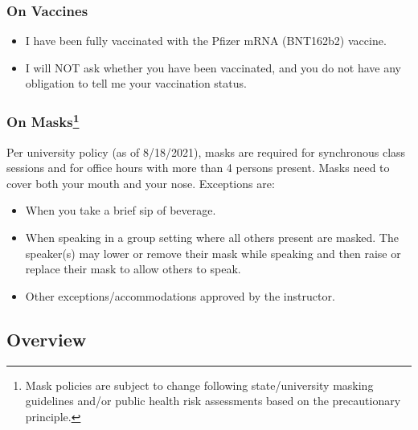 \documentclass[
]{article}
\providecommand{\tightlist}{%
  \setlength{\itemsep}{0pt}\setlength{\parskip}{0pt}}
\begin{document}
\hypertarget{on-vaccines}{%
\subsubsection{On Vaccines}\label{on-vaccines}}

\begin{itemize}
\tightlist
\item
  I have been fully vaccinated with the Pfizer mRNA (BNT162b2) vaccine.
\item
  I will NOT ask whether you have been vaccinated, and you do not have
  any obligation to tell me your vaccination status.
\end{itemize}

\hypertarget{on-masks2}{%
\subsubsection[On Masks]{\texorpdfstring{On
Masks\footnote{Mask policies are subject to change following
  state/university masking guidelines and/or public health risk
  assessments based on the precautionary principle.}}{On Masks}}\label{on-masks2}}

Per university policy (as of 8/18/2021), masks are required for
synchronous class sessions and for office hours with more than 4 persons
present. Masks need to cover both your mouth and your nose. Exceptions
are:

\begin{itemize}
\tightlist
\item
  When you take a brief sip of beverage.
\item
  When speaking in a group setting where all others present are masked.
  The speaker(s) may lower or remove their mask while speaking and then
  raise or replace their mask to allow others to speak.
\item
  Other exceptions/accommodations approved by the instructor.
\end{itemize}

\hypertarget{overview}{%
\subsection{Overview}\label{overview}}
\end{document}
